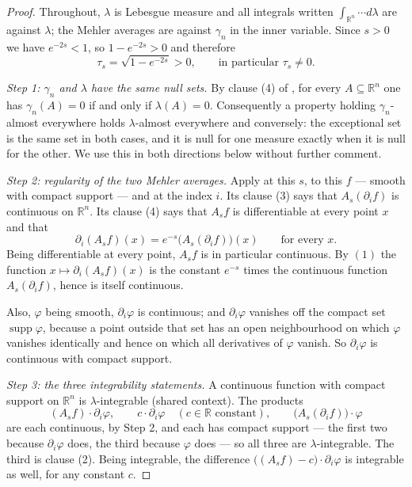 \begin{proof}
Throughout, $\lambda$ is Lebesgue measure and all integrals written
$\int_{\mathbb{R}^n}\cdots d\lambda$ are against $\lambda$; the Mehler averages
are against $\gamma_n$ in the inner variable.  Since $s > 0$ we have
$e^{-2s} < 1$, so $1-e^{-2s} > 0$ and therefore
\begin{equation*}
  \tau_s = \sqrt{1-e^{-2s}} > 0, \qquad\text{in particular } \tau_s \neq 0 .
  \tag{0}
\end{equation*}

\emph{Step 1: $\gamma_n$ and $\lambda$ have the same null sets.}
By clause (4) of , for every
$A \subseteq \mathbb{R}^n$ one has $\gamma_n(A) = 0$ if and only if
$\lambda(A) = 0$.  Consequently a property holding $\gamma_n$-almost everywhere
holds $\lambda$-almost everywhere and conversely: the exceptional set is the same
set in both cases, and it is null for one measure exactly when it is null for the
other.  We use this in both directions below without further comment.

\emph{Step 2: regularity of the two Mehler averages.}
Apply  at this $s$, to this $f$ --- smooth with
compact support --- and at the index $i$.  Its clause (3) says that
$A_s(\partial_if)$ is continuous on $\mathbb{R}^n$.  Its clause (4) says that
$A_sf$ is differentiable at every point $x$ and that
\begin{equation*}
  \partial_i(A_sf)(x) = e^{-s}\bigl(A_s(\partial_if)\bigr)(x)
  \qquad\text{for every } x . \tag{1}
\end{equation*}
Being differentiable at every point, $A_sf$ is in particular continuous.  By
$(1)$ the function $x \mapsto \partial_i(A_sf)(x)$ is the constant $e^{-s}$ times
the continuous function $A_s(\partial_if)$, hence is itself continuous.

Also, $\varphi$ being smooth, $\partial_i\varphi$ is continuous; and
$\partial_i\varphi$ vanishes off the compact set $\operatorname{supp}\varphi$,
because a point outside that set has an open neighbourhood on which $\varphi$
vanishes identically and hence on which all derivatives of $\varphi$ vanish.  So
$\partial_i\varphi$ is continuous with compact support.

\emph{Step 3: the three integrability statements.}
A continuous function with compact support on $\mathbb{R}^n$ is
$\lambda$-integrable (shared context).  The products
\[
  (A_sf)\cdot\partial_i\varphi,
  \qquad
  c\cdot\partial_i\varphi \quad (c \in \mathbb{R} \text{ constant}),
  \qquad
  \bigl(A_s(\partial_if)\bigr)\cdot\varphi
\]
are each continuous, by Step 2, and each has compact support --- the first two
because $\partial_i\varphi$ does, the third because $\varphi$ does --- so all
three are $\lambda$-integrable.  The third is clause (2).  Being integrable, the
difference $\bigl((A_sf) - c\bigr)\cdot\partial_i\varphi$ is integrable as well,
for any constant $c$.


\end{proof}
